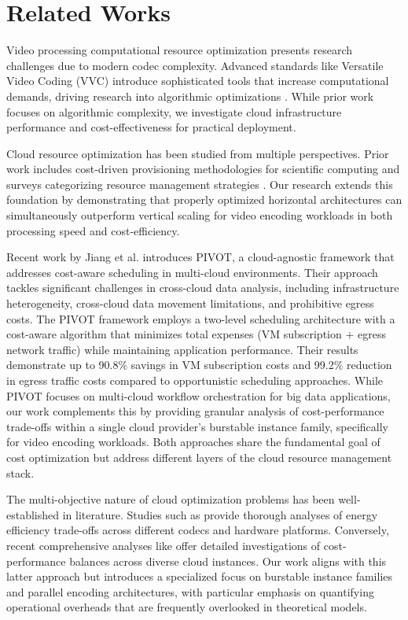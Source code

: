 \documentclass[conference]{IEEEtran}
\begin{document}
	\section{Related Works}
	
	\label{rel_works}
	
	Video processing computational resource optimization presents research challenges due to modern codec complexity. Advanced standards like Versatile Video Coding (VVC) introduce sophisticated tools that increase computational demands, driving research into algorithmic optimizations \cite{rosado2024coding, araujo2024fast}. While prior work focuses on algorithmic complexity, we investigate cloud infrastructure performance and cost-effectiveness for practical deployment.
	
	Cloud resource optimization has been studied from multiple perspectives. Prior work includes cost-driven provisioning methodologies for scientific computing \cite{pedro__lvarez_ed947120} and surveys categorizing resource management strategies \cite{lailan_m_haji_2b4efda5}. Our research extends this foundation by demonstrating that properly optimized horizontal architectures can simultaneously outperform vertical scaling for video encoding workloads in both processing speed and cost-efficiency.
	
	Recent work by Jiang et al. \cite{jiang2025cloud} introduces PIVOT, a cloud-agnostic framework that addresses cost-aware scheduling in multi-cloud environments. Their approach tackles significant challenges in cross-cloud data analysis, including infrastructure heterogeneity, cross-cloud data movement limitations, and prohibitive egress costs. The PIVOT framework employs a two-level scheduling architecture with a cost-aware algorithm that minimizes total expenses (VM subscription + egress network traffic) while maintaining application performance. Their results demonstrate up to 90.8\% savings in VM subscription costs and 99.2\% reduction in egress traffic costs compared to opportunistic scheduling approaches. While PIVOT focuses on multi-cloud workflow orchestration for big data applications, our work complements this by providing granular analysis of cost-performance trade-offs within a single cloud provider's burstable instance family, specifically for video encoding workloads. Both approaches share the fundamental goal of cost optimization but address different layers of the cloud resource management stack.
	
	The multi-objective nature of cloud optimization problems has been well-established in literature. Studies such as \cite{angeliki_katsenou_e0a9a00f} provide thorough analyses of energy efficiency trade-offs across different codecs and hardware platforms. Conversely, recent comprehensive analyses like \cite{Maas2025} offer detailed investigations of cost-performance balances across diverse cloud instances. Our work aligns with this latter approach but introduces a specialized focus on burstable instance families and parallel encoding architectures, with particular emphasis on quantifying operational overheads that are frequently overlooked in theoretical models.
	
\end{document}
